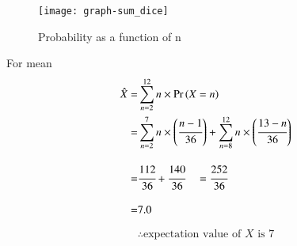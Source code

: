 \documentclass[journal,12pt,twocolumn]{IEEEtran}
\begin{document}
\begin{table}[h!]
    \caption{Probability as a function of n }
    \label{tab:probability_function}
\end{table}
\newpage
\begin{figure}[h]
    \centering
    \texttt{[image: graph-sum\_dice]}
    \caption{Probability as a function of n}
    \label{fig:fig_comp}
\end{figure}
For mean
\begin{align}
    \hat X =& \sum_{n=2}^{12}{n\times\Pr\left(X=n\right)}
    \\=& \sum_{n=2}^{7}{n\times \left(\cfrac{n-1}{36}\right)} + \sum_{n=8}^{12}{n\times \left(\cfrac{13-n}{36}\right)}
    \\[2ex]=& \cfrac{112}{36} + \cfrac{140}{36} \quad = \cfrac{252}{36}
    \\[2ex] =& 7.0
\end{align}

\[ \therefore \text{expectation value of } X \text{ is } 7  \]
\end{document}
